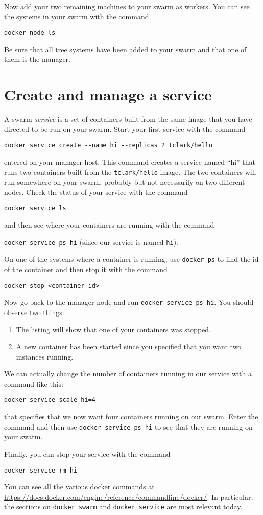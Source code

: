 \documentclass{article}
\begin{document}
Now add your two remaining machines to your swarm as workers. You can see the systems in your swarm with the command

\texttt{docker node ls}

Be sure that all tree systems have been added to your swarm and that one of them is the manager.

\section{Create and manage a service}
A swarm \emph{service} is a set of containers built from the same image that you have directed to be run on your swarm. Start your first service with the command 

\begin{verbatim}
docker service create --name hi --replicas 2 tclark/hello
\end{verbatim}

entered on your manager host. This command creates a service named ``hi'' that runs two containers built from the \texttt{tclark/hello} image. The two containers will run somewhere on your swarm, probably but not necessarily on two different nodes. Check the status of your service with the command

\texttt{docker service ls}

and then see where your containers are running with the command

\texttt{docker service ps hi} (since our service is named \texttt{hi}).

On one of the systems where a container is running, use \texttt{docker ps} to find the id of the container and then stop it with the command

\texttt{docker stop <container-id>}

Now go back to the manager node and run \texttt{docker service ps hi}. You should observe two things:

\begin{enumerate}
  \item The listing will show that one of your containers was stopped.
  \item A new container has been started since you specified that you want two instances running.
\end{enumerate}

We can actually change the number of containers running in our service with a command like this:

\texttt{docker service scale hi=4}

that specifies that we now want four containers running on our swarm. Enter the command and then use \texttt{docker service ps hi} to see that they are running on your swarm.

Finally, you can stop your service with the command

\texttt{docker service rm hi}

You can see all the various docker commands at \url{https://docs.docker.com/engine/reference/commandline/docker/}. In particular, the sections on \texttt{docker swarm} and \texttt{docker service} are most relevant today.
\end{document}
